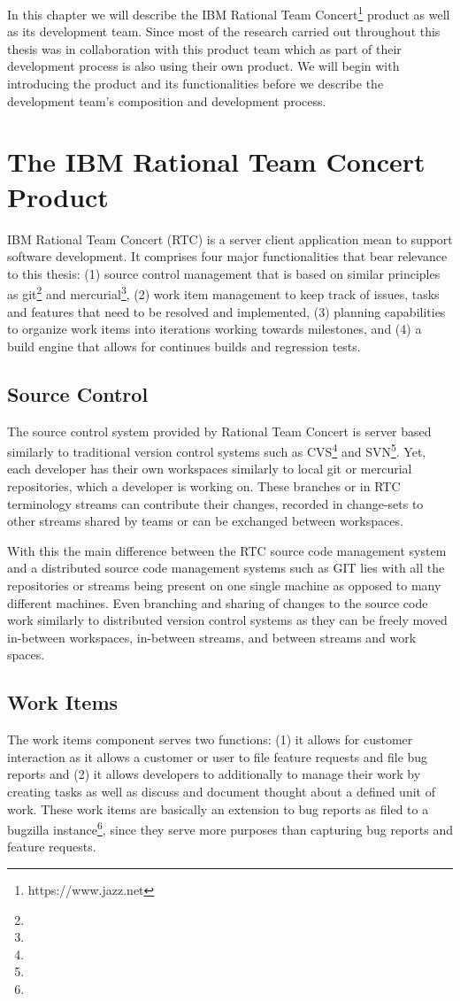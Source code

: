 In this chapter we will describe the IBM Rational Team Concert\footnote{https://www.jazz.net} product as well as its development team.
Since most of the research carried out throughout this thesis was in collaboration with this product team which as part of their development process is also using their own product.
We will begin with introducing the product and its functionalities before we describe the development team's composition and development process.

\section{The IBM Rational Team Concert Product}
IBM Rational Team Concert (RTC) is a server client application mean to support software development.
It comprises four major functionalities that bear relevance to this thesis:
(1) source control management that is based on similar principles as git\footnote{} and mercurial\footnote{}, (2) work item management to keep track of issues, tasks and features that need to be resolved and implemented, (3) planning capabilities to organize work items into iterations working towards milestones, and (4) a build engine that allows for continues builds and regression tests.

\subsection{Source Control}
The source control system provided by Rational Team Concert is server based similarly to traditional version control systems such as CVS\footnote{} and SVN\footnote{}.
Yet, each developer has their own workspaces similarly to local git or mercurial repositories, which a developer is working on.
These branches or in RTC terminology streams can contribute their changes, recorded in change-sets to other streams shared by teams or can be exchanged between workspaces.

With this the main difference between the RTC source code management system and a distributed source code management systems such as GIT lies with all the repositories or streams being present on one single machine as opposed to many different machines.
Even branching and sharing of changes to the source code work similarly to distributed version control systems as they can be freely moved in-between workspaces, in-between streams, and between streams and work spaces.

\subsection{Work Items}
The work items component serves two functions: (1) it allows for customer interaction as it allows a customer or user to file feature requests and file bug reports and (2) it allows developers to additionally to manage their work by creating tasks as well as discuss and document thought about a defined unit of work.
These work items are basically an extension to bug reports as filed to a bugzilla instance\footnote{}, since they serve more purposes than capturing bug reports and feature requests.

